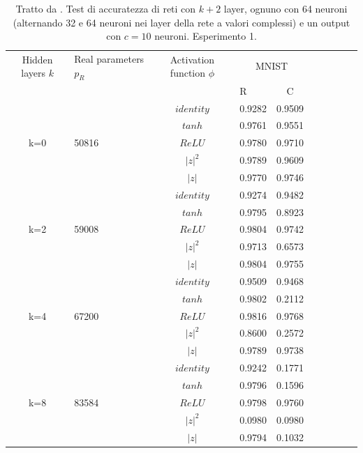 \documentclass[a4paper,12pt]{report}
\begin{document}
 \begin{table}
  \centering
  \begin{tabular}{cp{} cp{}   cp{} cp{} cp{}}
   \cline{1-5}
   Hidden layers $k$ & Real parameters $p_R$ & Activation function $\phi$ & \multicolumn{2}{c}{MNIST}\\
   \cline{4-5}
   & & & R & C \\
   \cline{1-5}
   & & $identity$ & 0.9282 & 0.9509 \\
   \cline{3-5}
   & & $tanh$ & 0.9761 & 0.9551 \\
   \cline{3-5}
   k=0 & 50816 & $ReLU$ & 0.9780 & 0.9710 \\
   \cline{3-5}
   & & $|z|^2$ & 0.9789 & 0.9609 \\
   \cline{3-5}
   & & $|z|$ & 0.9770 & 0.9746 \\
   \cline{1-5}
  
   & & $identity$ & 0.9274 & 0.9482 \\
   \cline{3-5}
   & & $tanh$ & 0.9795 & 0.8923 \\
   \cline{3-5}
   k=2 & 59008 & $ReLU$ & 0.9804 & 0.9742 \\
   \cline{3-5}
   & & $|z|^2$ & 0.9713 & 0.6573 \\
   \cline{3-5}
   & & $|z|$ & 0.9804 & 0.9755 \\
   \cline{1-5}
  
   & & $identity$ & 0.9509 & 0.9468 \\
   \cline{3-5}
   & & $tanh$ & 0.9802 & 0.2112 \\
   \cline{3-5}
   k=4 & 67200 & $ReLU$ & 0.9816 & 0.9768 \\
   \cline{3-5}
   & & $|z|^2$ & 0.8600 & 0.2572 \\
   \cline{3-5}
   & & $|z|$ & 0.9789 & 0.9738 \\
   \cline{1-5}
   
   & & $identity$ & 0.9242 & 0.1771 \\
   \cline{3-5}
   & & $tanh$ & 0.9796 & 0.1596 \\
   \cline{3-5}
   k=8 & 83584 & $ReLU$ & 0.9798 & 0.9760 \\
   \cline{3-5}
   & & $|z|^2$ & 0.0980 & 0.0980 \\
   \cline{3-5}
   & & $|z|$ & 0.9794 & 0.1032 \\
   \cline{1-5}
  \end{tabular}
  \caption{Tratto da \cite{monning2018evaluation}. Test di accuratezza di reti con $k+2$ layer, ognuno con 64 neuroni (alternando 32 e 64 neuroni nei layer della rete a valori complessi) e un output con $c=10$ neuroni. Esperimento 1.}
  \label{MNIST1Tab}
 \end{table}
 
\end{document}
